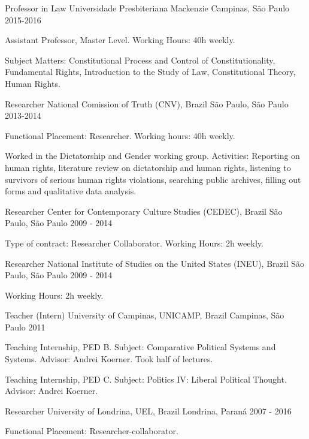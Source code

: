 
\begin{cventries}

\cventry
{Professor in Law}
{Universidade Presbiteriana Mackenzie}
{Campinas, São Paulo}
{2015-2016}
{
\begin{cvitems}
  \item Assistant Professor, Master Level. Working Hours: 40h weekly.
  \item Subject Matters: Constitutional Process and Control of Constitutionality, Fundamental Rights, Introduction to the Study of Law, Constitutional Theory, Human Rights.
\end{cvitems}
}

\cventry
{Researcher}
{National Comission of Truth (CNV), Brazil}
{São Paulo, São Paulo}
{2013-2014}
{
\begin{cvitems}
  \item Functional Placement: Researcher. Working hours: 40h weekly.
  \item Worked in the Dictatorship and Gender working group. Activities: Reporting on human rights, literature review on dictatorship and human rights, listening to survivors of serious human rights violations, searching public archives, filling out forms and qualitative data analysis.
\end{cvitems}
}

\cventry
{Researcher}
{Center for Contemporary Culture Studies (CEDEC), Brazil}
{São Paulo, São Paulo}
{2009 - 2014}
{
\begin{cvitems}
  \item Type of contract: Researcher Collaborator. Working Hours: 2h weekly.
\end{cvitems}
}

\cventry
{Researcher}
{National Institute of Studies on the United States (INEU), Brazil}
{São Paulo, São Paulo}
{2009 - 2014}
{
\begin{cvitems}
  \item Working Hours: 2h weekly.
\end{cvitems}
}

\cventry
{Teacher (Intern)}
{University of Campinas, UNICAMP, Brazil}
{Campinas, São Paulo}
{2011}
{
\begin{cvitems}
  \item Teaching Internship, PED B. Subject: Comparative Political Systems and Systems. Advisor: Andrei Koerner. Took half of lectures.
  \item Teaching Internship, PED C. Subject: Politics IV: Liberal Political Thought. Advisor: Andrei Koerner.
\end{cvitems}
}

\cventry
{Researcher}
{University of Londrina, UEL, Brazil}
{Londrina, Paraná}
{2007 - 2016}
{
\begin{cvitems}
  \item Functional Placement: Researcher-collaborator.
\end{cvitems}
}

\end{cventries}

